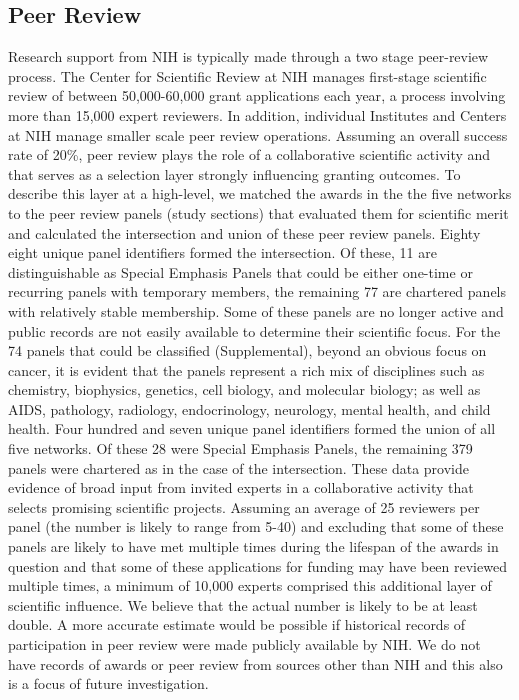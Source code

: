 \documentclass[10pt,letterpaper]{article}
\begin{document}
\subsection*{Peer Review} Research support from NIH is typically made through a two stage peer-review process.  The Center for Scientific Review at NIH manages first-stage scientific review of between 50,000-60,000 grant applications each year\cite{bibBoyack}, a process involving more than 15,000 expert reviewers. In addition, individual Institutes and Centers at NIH manage smaller scale peer review operations. Assuming an overall success rate of 20\%, peer review plays the role of a collaborative scientific activity and that serves as a selection layer strongly influencing granting outcomes. To describe this layer at a high-level, we matched the awards in the the five networks to the peer review panels (study sections) that evaluated them for scientific merit and calculated the intersection and union of these peer review panels. Eighty eight unique panel identifiers formed the intersection. Of these, 11 are distinguishable as Special Emphasis Panels that could be either one-time or recurring panels with temporary members, the remaining 77 are chartered panels with relatively stable membership. Some of these panels are no longer active and public records are not easily available to determine their scientific focus. For the 74 panels that could be classified (Supplemental), beyond an obvious focus on cancer, it is evident that the panels represent a rich mix of disciplines such as chemistry, biophysics, genetics, cell biology, and molecular biology; as well as AIDS, pathology, radiology, endocrinology, neurology, mental health, and child health. Four hundred and seven unique panel identifiers formed the union of all five networks. Of these 28 were Special Emphasis Panels, the remaining 379 panels were chartered as in the case of the intersection. These data provide evidence of broad input from invited experts in a collaborative activity that selects promising scientific projects. Assuming an average of 25 reviewers per panel (the number is likely to range from 5-40) and excluding that some of these panels are likely to have met multiple times during the lifespan of the awards in question and that some of these applications for funding may have been reviewed multiple times, a minimum of 10,000 experts comprised this additional layer of scientific influence. We believe that the actual number is likely to be at least double. A more accurate estimate would be possible if historical records of participation in peer review were made publicly available by NIH. We do not have records of awards or peer review from sources other than NIH and this also is a focus of future investigation.
\end{document}
